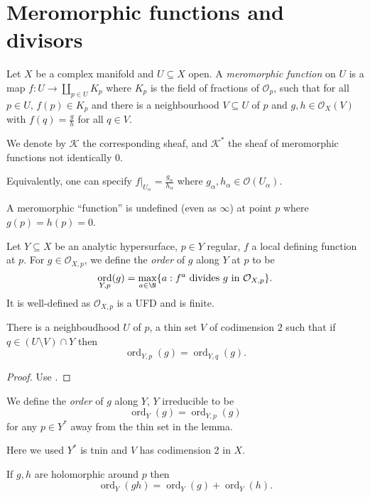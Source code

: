 \documentclass[a4paper]{article}
\DeclareMathOperator{\ord}{ord} %
\begin{document}
\section{Meromorphic functions and divisors}

\begin{definition}
  Let \(X\) be a complex manifold and \(U \subseteq X\) open. A \emph{meromorphic function} on \(U\) is a map \(f: U \to \coprod_{p \in U} K_p\) where \(K_p\) is the field of fractions of \(\mathcal O_p\), such that for all \(p \in U\), \(f(p) \in K_p\) and there is a neighbourhood \(V \subseteq U\) of \(p\) and \(g, h \in \mathcal O_X(V)\) with \(f(q) = \frac{g}{h}\) for all \(q \in V\).

  We denote by \(\mathcal K\) the corresponding sheaf, and \(\mathcal K^*\) the sheaf of meromorphic functions not identically \(0\).
\end{definition}

\begin{ex}
  Equivalently, one can specify \(f|_{U_\alpha} = \frac{g_\alpha}{h_\alpha}\) where \(g_\alpha, h_\alpha \in \mathcal O(U_\alpha)\).
\end{ex}

A meromorphic ``function'' is undefined (even as \(\infty\)) at point \(p\) where \(g(p) = h(p) = 0\).

\begin{definition}
  Let \(Y \subseteq X\) be an analytic hypersurface, \(p \in Y\) regular, \(f\) a local defining function at \(p\). For \(g \in \mathcal O_{X, p}\), we define the \emph{order} of \(g\) along \(Y\) at \(p\) to be
  \[
    \ord_{Y, p}(g) = \max_{a \in \N} \{a: f^a \text{ divides } g \text{ in } \mathcal O_{X, p}\}.
  \]
  It is well-defined as \(\mathcal O_{X, p}\) is a UFD and is finite.
\end{definition}

\begin{lemma}
  There is a neighboudhood \(U\) of \(p\), a thin set \(V\) of codimension \(2\) such that if \(q \in (U \setminus V) \cap Y\) then
  \[
    \ord_{Y, p}(g) = \ord_{Y, q}(g).
  \]
\end{lemma}

\begin{proof}
  Use .
\end{proof}

\begin{definition}[order]
  We define the \emph{order} of \(g\) along \(Y\), \(Y\) irreducible to be
  \[
    \ord_Y(g) = \ord_{Y, p}(g)
  \]
  for any \(p \in Y^*\) away from the thin set in the lemma.
\end{definition}

Here we used \(Y^*\) is tnin and \(V\) has codimension 2 in \(X\).

If \(g, h\) are holomorphic around \(p\) then
\[
  \ord_Y (gh) = \ord_Y (g) + \ord_Y (h).
\]



 












\printindex
\end{document}
